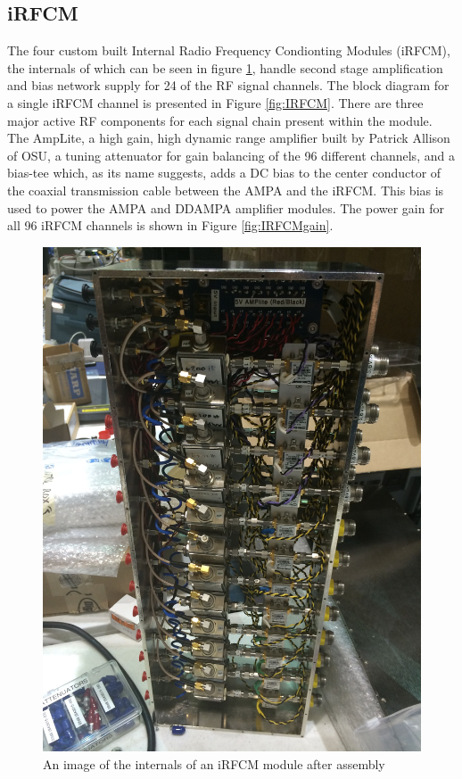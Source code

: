 	\subsection{iRFCM}
	The four custom built Internal Radio Frequency Condionting Modules (iRFCM), the internals of which can be seen in figure \ref{fig:IRFCMpic}, handle second stage amplification and bias network supply for 24 of the RF signal channels.  The block diagram for a single iRFCM channel is presented in Figure \ref{fig:IRFCM}.  There are three major active RF components for each signal chain present within the module. The AmpLite, a high gain, high dynamic range amplifier built by Patrick Allison of OSU, a tuning attenuator for gain balancing of the 96 different channels, and a bias-tee which, as its name suggests, adds a DC bias to the center conductor of the coaxial transmission cable between the AMPA and the iRFCM.  This bias is used to power the AMPA and DDAMPA amplifier modules.  The power gain for all 96 iRFCM channels is shown in Figure \ref{fig:IRFCMgain}.

\begin{figure}
\centering
	\includegraphics[height=0.9\textheight]{figures/IRFCMpic}
	\caption{An image of the internals of an iRFCM module after assembly}
	\label{fig:IRFCMpic}
\end{figure}

